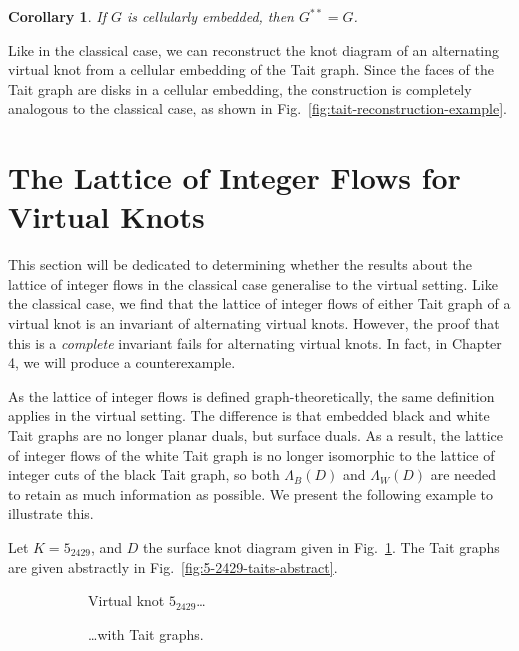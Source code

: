 \documentclass[12pt]{report}
\newtheorem*{corollary}{Corollary}
\theoremstyle{upright}
\begin{document}
\begin{corollary}
If $G$ is cellularly embedded, then $G^{**} = G$.
\end{corollary}

Like in the classical case, we can reconstruct the knot diagram of an alternating virtual knot from a cellular embedding of the Tait graph. Since the faces of the Tait graph are disks in a cellular embedding, the construction is completely analogous to the classical case, as shown in Fig.~\ref{fig:tait-reconstruction-example}.

\section{The Lattice of Integer Flows for Virtual Knots}

This section will be dedicated to determining whether the results about the lattice of integer flows in the classical case generalise to the virtual setting. Like the classical case, we find that the lattice of integer flows of either Tait graph of a virtual knot is an invariant of alternating virtual knots. However, the proof that this is a \textit{complete} invariant fails for alternating virtual knots. In fact, in Chapter 4, we will produce a counterexample.

As the lattice of integer flows is defined graph-theoretically, the same definition applies in the virtual setting. The difference is that embedded black and white Tait graphs are no longer planar duals, but surface duals. As a result, the lattice of integer flows of the white Tait graph is no longer isomorphic to the lattice of integer cuts of the black Tait graph, so both $\Lambda_{B}(D)$ and $\Lambda_{W}(D)$ are needed to retain as much information as possible. We present the following example to illustrate this.

Let $K = 5_{2429}$, and $D$ the surface knot diagram given in Fig.~\ref{fig:5-2429-vknot}. The Tait graphs are given abstractly in Fig.~\ref{fig:5-2429-taits-abstract}.

\begin{figure}[hbt]
	\hspace*{\fill}
	\begin{subfigure}[b]{0.45 \textwidth}
		\centering
		\def\svgscale{0.35}
		
		\caption{Virtual knot $5_{2429}$\ldots}
		\label{fig:5-2429-vknot}
	\end{subfigure}
	\hspace*{\fill}
	\begin{subfigure}[b]{0.45 \textwidth}
		\centering
		\def\svgscale{0.35}
		
		\caption{\ldots with Tait graphs.}
		\label{fig:5-2429-taits}
	\end{subfigure}
	\hspace*{\fill}
	\caption{}
	\label{fig:5-2429-example}
\end{figure}
\end{document}
